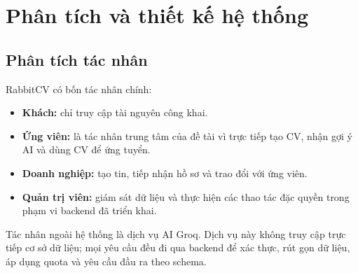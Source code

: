 \chapter{Phân tích và thiết kế hệ thống}

\section{Phân tích tác nhân}

RabbitCV có bốn tác nhân chính:

\begin{itemize}
    \item \textbf{Khách:} chỉ truy cập tài nguyên công khai.
    \item \textbf{Ứng viên:} là tác nhân trung tâm của đề tài vì trực tiếp tạo CV, nhận gợi ý AI và dùng CV để ứng tuyển.
    \item \textbf{Doanh nghiệp:} tạo tin, tiếp nhận hồ sơ và trao đổi với ứng viên.
    \item \textbf{Quản trị viên:} giám sát dữ liệu và thực hiện các thao tác đặc quyền trong phạm vi backend đã triển khai.
\end{itemize}

Tác nhân ngoài hệ thống là dịch vụ AI Groq. Dịch vụ này không truy cập trực tiếp cơ sở dữ liệu; mọi yêu cầu đều đi qua backend để xác thực, rút gọn dữ liệu, áp dụng quota và yêu cầu đầu ra theo schema.

